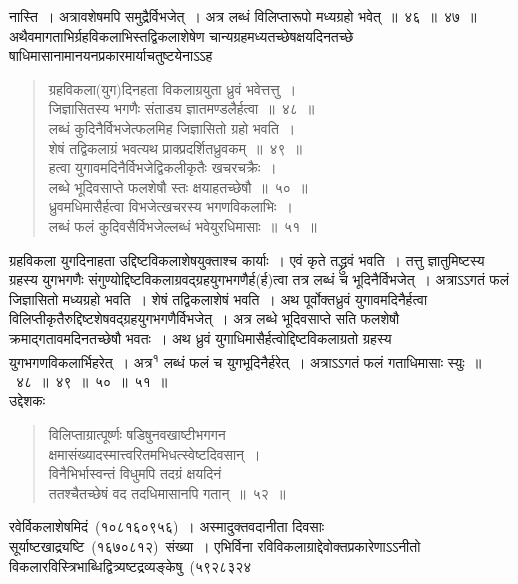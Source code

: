 \documentclass[11pt, openany]{book}
\begin{document}
\newpage
\thispagestyle{fancy}
\fancyhf{}
\noindent
नास्ति~। अत्रावशेषमपि समुद्रैर्विभजेत्~। अत्र लब्धं विलिप्तारूपो मध्यग्रहो भवेत्~॥~४६~॥~४७~॥\\

\indent
अथैवमागताभिर्ग्रहविकलाभिस्तद्विकलाशेषेण चान्यग्रहमध्यतच्छेषक्षयदिनतच्छे
षाधिमासानामानयनप्रकारमार्याचतुष्टयेनाऽऽह\textendash\begin{quote}
{\ks ग्रहविकला(युग)दिनहता विकलाग्रयुता ध्रुवं भवेत्तत्तु~।\\
जिज्ञासितस्य भगणैः संताड्य ज्ञातमण्डलैर्हत्वा~॥~४८~॥\\
लब्धं कुदिनैर्विभजेत्फलमिह जिज्ञासितो ग्रहो भवति~।\\
शेषं तद्विकलाग्रं भवत्यथ प्राक्प्रदर्शितध्रुवकम्~॥~४९~॥\\
हत्वा युगावमदिनैर्विभजेद्विकलीकृतैः खचरचक्रैः~।\\
लब्धे भूदिवसाप्ते फलशेषौ स्तः क्षयाहतच्छेषौ~॥~५०~॥\\
ध्रुवमधिमासैर्हत्वा विभजेत्खचरस्य भगणविकलाभिः~।\\
लब्धं फलं कुदिवसैर्विभजेल्लब्धं भवेयुरधिमासाः~॥~५१~॥}
\end{quote}
\indent
ग्रहविकला युगदिनाहता उद्दिष्टविकलाशेषयुक्ताश्च कार्याः~। एवं कृते तद्ध्रुवं भवति~। तत्तु ज्ञातुमिष्टस्य ग्रहस्य युगभगणैः संगुण्योद्दिष्टविकलाग्रवद्ग्रहयुगभगणैर्ह(र्ह)त्वा तत्र लब्धं च भूदिनैर्विभजेत्~। अत्राऽऽगतं फलं जिज्ञासितो मध्यग्रहो भवति~। शेषं तद्विकलाशेषं भवति~। अथ पूर्वोक्तध्रुवं युगावमदिनैर्हत्वा विलिप्तीकृतैरुद्दिष्टशेषवद्ग्रहयुगभगणैर्विभजेत्~। अत्र लब्धे भूदिवसाप्ते सति फलशेषौ क्रमाद्गतावमदिनतच्छेषौ भवतः~। अथ ध्रुवं युगाधिमासैर्हत्वोद्दिष्टविकलाग्रतो ग्रहस्य युगभगणविकलार्भिहरेत्~। अत्र\textsuperscript{१} लब्धं फलं च युगभूदिनैर्हरेत्~। अत्राऽऽगतं फलं गताधिमासाः स्युः~॥~४८~॥~४९~॥~५०~॥~५१~॥\\
\indent
उद्देशकः\textendash
\begin{quote}
 {\ku विलिप्ताग्रात्पूर्ष्णः षडिषुनवखाष्टीभगगन\textendash\\
क्षमासंख्यादस्मात्त्वरितमभिधत्स्वेष्टदिवसान्~।\\
विनैभिर्भास्वन्तं विधुमपि तदग्रं क्षयदिनं\\
ततश्चैतच्छेषं वद तदधिमासानपि गतान्~॥~५२~॥}
\end{quote}
\indent
रवेर्विकलाशेषमिदं~(१०८१६०९५६)~। अस्मादुक्तवदानीता दिवसाः सूर्याष्टखाद्र्यष्टि~(१६७०८१२)~संख्या~। एभिर्विना रविविकलाग्राद्देवोक्तप्रकारेणाऽऽनीतो विकलारविस्त्रिभाब्धिद्वित्र्यष्टद्रव्यङ्केषु~(५९२८३२४\textendash
\end{document}
